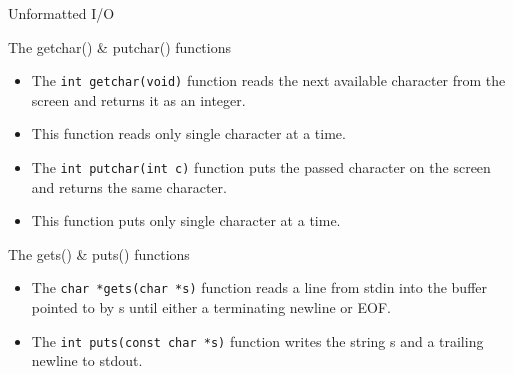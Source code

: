 \documentclass[10pt,t]{beamer}
\begin{document}
\begin{frame}[fragile]{Unformatted I/O}
  \begin{block}{The getchar() \& putchar() functions}
    \begin{itemize}
      \item The \lstinline|int getchar(void)| function reads the next available character from the screen and returns it as an integer. 
      \item[] This function reads only single character at a time.
      \item The \lstinline|int putchar(int c)| function puts the passed character on the screen and returns the same character. 
      \item[] This function puts only single character at a time. 
    \end{itemize}
  \end{block}

  \begin{block}{The gets() \& puts() functions}
    \begin{itemize}
      \item The \lstinline|char *gets(char *s)| function reads a line from stdin into the buffer pointed to by s until either a terminating newline or EOF.
      \item The \lstinline|int puts(const char *s)| function writes the string s and a trailing newline to stdout.
    \end{itemize}
  \end{block}
\end{frame}

\begin{frame}[fragile]
  \begin{columns}
    
    
  \end{columns}
\end{frame}
\end{document}
